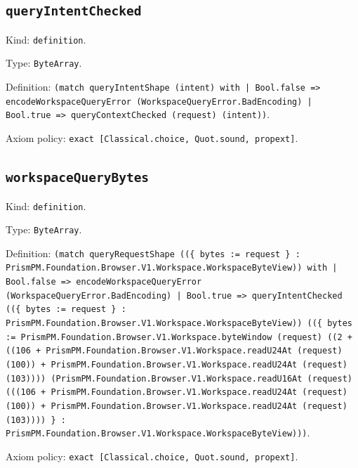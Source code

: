 \documentclass[11pt]{article}
\begin{document}
\subsection*{\texttt{queryIntentChecked}}
\noindent Kind: \texttt{definition}.\par
\noindent Type: \texttt{ByteArray}.\par
\noindent Definition: \texttt{(match queryIntentShape (intent) with | Bool.false => encodeWorkspaceQueryError (WorkspaceQueryError.BadEncoding) | Bool.true => queryContextChecked (request) (intent))}.\par
\noindent Axiom policy: \texttt{exact [Classical.choice, Quot.sound, propext]}.\par
\subsection*{\texttt{workspaceQueryBytes}}
\noindent Kind: \texttt{definition}.\par
\noindent Type: \texttt{ByteArray}.\par
\noindent Definition: \texttt{(match queryRequestShape ((\{ bytes := request \} : PrismPM.Foundation.Browser.V1.Workspace.WorkspaceByteView)) with | Bool.false => encodeWorkspaceQueryError (WorkspaceQueryError.BadEncoding) | Bool.true => queryIntentChecked ((\{ bytes := request \} : PrismPM.Foundation.Browser.V1.Workspace.WorkspaceByteView)) ((\{ bytes := PrismPM.Foundation.Browser.V1.Workspace.byteWindow (request) ((2 + ((106 + PrismPM.Foundation.Browser.V1.Workspace.readU24At (request) (100)) + PrismPM.Foundation.Browser.V1.Workspace.readU24At (request) (103)))) (PrismPM.Foundation.Browser.V1.Workspace.readU16At (request) (((106 + PrismPM.Foundation.Browser.V1.Workspace.readU24At (request) (100)) + PrismPM.Foundation.Browser.V1.Workspace.readU24At (request) (103)))) \} : PrismPM.Foundation.Browser.V1.Workspace.WorkspaceByteView)))}.\par
\noindent Axiom policy: \texttt{exact [Classical.choice, Quot.sound, propext]}.\par
\end{document}
